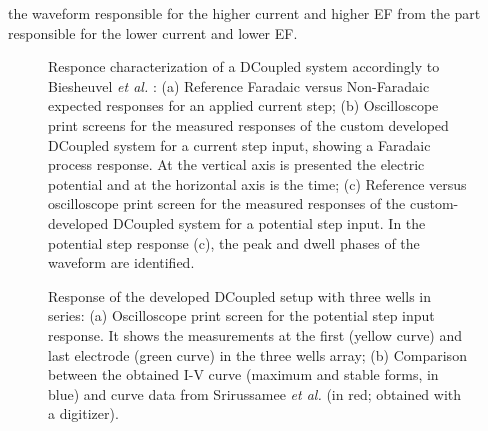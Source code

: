 the waveform responsible for the higher current and higher \acs{EF} from the part responsible for the lower current and lower \acs{EF}.    

\begin{figure}
\caption{Responce characterization of a DCoupled system accordingly to Biesheuvel \textit{et al.} \cite{Biesheuvel2018-wu}: (a) Reference Faradaic versus Non-Faradaic expected responses for an applied current step; (b) Oscilloscope print screens for the measured responses of the custom developed DCoupled system for a current step input, showing a Faradaic process response. At the vertical axis is presented the electric potential and at the horizontal axis is the time; (c) Reference versus oscilloscope print screen for the measured responses of the custom-developed DCoupled system for a potential step input. In the potential step response (c), the peak and dwell phases of the waveform are identified.}
\label{fig4d4}
\end{figure}

\begin{figure}
\caption{Response of the developed DCoupled setup with three wells in series: (a) Oscilloscope print screen for the potential step input response. It shows the measurements at the first (yellow curve) and last electrode (green curve) in the three wells array; (b) Comparison between the obtained I-V curve (maximum and stable forms, in blue) and curve data from Srirussamee \textit{et al.} \cite{Srirussamee2021-cj} (in red; obtained with a digitizer).}
\label{fig4d5}
\end{figure}


